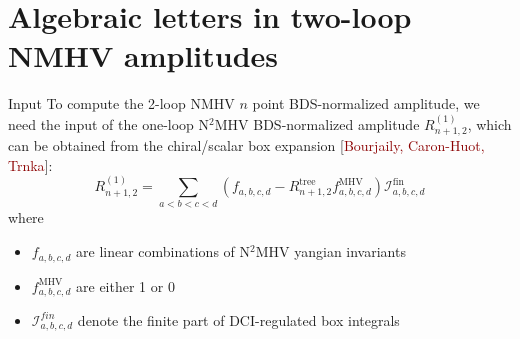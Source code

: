 \documentclass[10pt]{beamer}
\begin{document}


\section{Algebraic letters in two-loop NMHV amplitudes}

\begin{frame}[t]{Input}
To compute the 2-loop NMHV $n$ point BDS-normalized amplitude, we need the input of the one-loop N$^{2}$MHV BDS-normalized amplitude $R_{n+1,2}^{(1)}$, which can be obtained from the chiral/scalar box expansion {\footnotesize[\textcolor{darkred}{Bourjaily, Caron-Huot, Trnka}]}:
\begin{equation*}
  R_{n+1,2}^{(1)} =\sum_{a<b<c<d} (f_{a,b,c,d}-R_{n+1,2}^{\text{tree}} f_{a,b,c,d}^{\text{MHV}})\mathcal{I}_{a,b,c,d}^{\text{fin}}
\end{equation*}
where
\begin{itemize}
  \item $f_{a,b,c,d}$ are linear combinations of N$^{2}$MHV yangian invariants
  \item $f_{a,b,c,d}^{\text{MHV}}$ are either 1 or 0
  \item $\mathcal{I}_{a,b,c,d}^{fin}$ denote the finite part of DCI-regulated box integrals
\end{itemize}

\end{frame}
\end{document}
